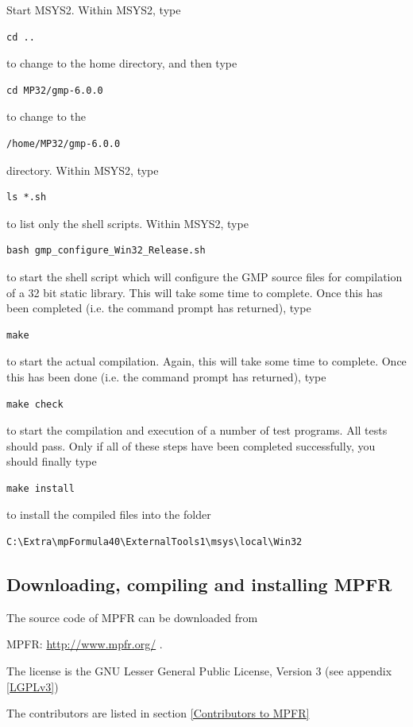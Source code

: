 \vpara
Start MSYS2. Within MSYS2, type
\begin{verbatim}
cd ..
\end{verbatim}
to change to the home directory, and then type 
\begin{verbatim}
cd MP32/gmp-6.0.0
\end{verbatim}
to change to the
\begin{verbatim}
/home/MP32/gmp-6.0.0
\end{verbatim}
directory. Within MSYS2, type
\begin{verbatim}
ls *.sh
\end{verbatim}
to list only the shell scripts. Within MSYS2, type
\begin{verbatim}
bash gmp_configure_Win32_Release.sh
\end{verbatim}
to start the shell script which will configure the GMP source files for compilation of a 32 bit static library. This will take some time to complete. Once this has been completed (i.e. the command prompt has returned), type
\begin{verbatim}
make
\end{verbatim}
to start the actual compilation. Again, this will take some time to complete. Once this has been done (i.e. the command prompt has returned), type
\begin{verbatim}
make check
\end{verbatim}
to start the compilation and execution of a number of test programs. All tests should pass. Only if all of these steps have been completed successfully, you should finally type
\begin{verbatim}
make install
\end{verbatim}
to install the compiled files into the folder
\begin{verbatim}
C:\Extra\mpFormula40\ExternalTools1\msys\local\Win32
\end{verbatim}



\newpage
\subsection{Downloading, compiling and installing MPFR}
The source code of MPFR can be downloaded from

MPFR: \href{http://www.mpfr.org/}{http://www.mpfr.org/} . 

The license is the GNU Lesser General Public License, Version 3 (see appendix \ref{LGPLv3})

The contributors are listed in section \ref{Contributors to MPFR}

